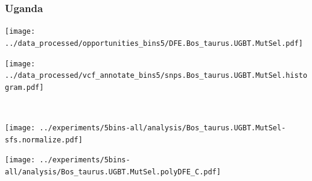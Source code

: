 \subsubsection{Uganda}

\begin{minipage}{0.49\linewidth}
    \texttt{[image: ../data\_processed/opportunities\_bins5/DFE.Bos\_taurus.UGBT.MutSel.pdf]}
\end{minipage}
\begin{minipage}{0.49\linewidth}
    \texttt{[image: ../data\_processed/vcf\_annotate\_bins5/snps.Bos\_taurus.UGBT.MutSel.histogram.pdf]}
\end{minipage}
\\
\begin{minipage}{0.49\linewidth}
    \texttt{[image: ../experiments/5bins-all/analysis/Bos\_taurus.UGBT.MutSel-sfs.normalize.pdf]}
\end{minipage}
\begin{minipage}{0.4\linewidth}
    \texttt{[image: ../experiments/5bins-all/analysis/Bos\_taurus.UGBT.MutSel.polyDFE\_C.pdf]}
\end{minipage}
